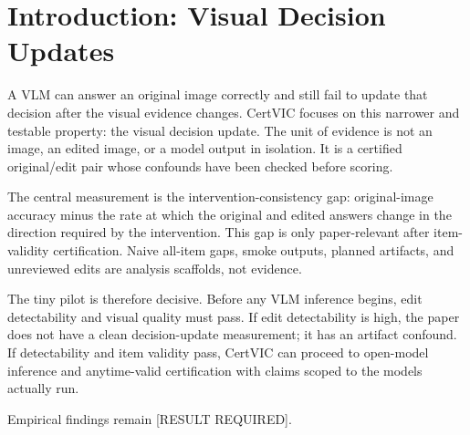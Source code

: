 \section{Introduction: Visual Decision Updates}

A VLM can answer an original image correctly and still fail to update that
decision after the visual evidence changes. CertVIC focuses on this narrower and
testable property: the visual decision update. The unit of evidence is not an
image, an edited image, or a model output in isolation. It is a certified
original/edit pair whose confounds have been checked before scoring.

The central measurement is the intervention-consistency gap: original-image
accuracy minus the rate at which the original and edited answers change in the
direction required by the intervention. This gap is only paper-relevant after
item-validity certification. Naive all-item gaps, smoke outputs, planned
artifacts, and unreviewed edits are analysis scaffolds, not evidence.

The tiny pilot is therefore decisive. Before any VLM inference begins, edit
detectability and visual quality must pass. If edit detectability is high, the
paper does not have a clean decision-update measurement; it has an artifact
confound. If detectability and item validity pass, CertVIC can proceed to
open-model inference and anytime-valid certification with claims scoped to the
models actually run.

Empirical findings remain [RESULT REQUIRED].
